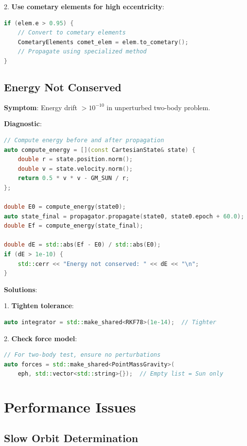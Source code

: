 2. \textbf{Use cometary elements for high eccentricity}:
\begin{lstlisting}[language=C++]
if (elem.e > 0.95) {
    // Convert to cometary elements
    CometaryElements comet_elem = elem.to_cometary();
    // Propagate using specialized method
}
\end{lstlisting}

\subsection{Energy Not Conserved}

\textbf{Symptom}: Energy drift $> 10^{-10}$ in unperturbed two-body problem.

\textbf{Diagnostic}:
\begin{lstlisting}[language=C++]
// Compute energy before and after propagation
auto compute_energy = [](const CartesianState& state) {
    double r = state.position.norm();
    double v = state.velocity.norm();
    return 0.5 * v * v - GM_SUN / r;
};

double E0 = compute_energy(state0);
auto state_final = propagator.propagate(state0, state0.epoch + 60.0);
double Ef = compute_energy(state_final);

double dE = std::abs(Ef - E0) / std::abs(E0);
if (dE > 1e-10) {
    std::cerr << "Energy not conserved: " << dE << "\n";
}
\end{lstlisting}

\textbf{Solutions}:

1. \textbf{Tighten tolerance}:
\begin{lstlisting}[language=C++]
auto integrator = std::make_shared<RKF78>(1e-14);  // Tighter
\end{lstlisting}

2. \textbf{Check force model}:
\begin{lstlisting}[language=C++]
// For two-body test, ensure no perturbations
auto forces = std::make_shared<PointMassGravity>(
    eph, std::vector<std::string>{});  // Empty list = Sun only
\end{lstlisting}

\section{Performance Issues}

\subsection{Slow Orbit Determination}

